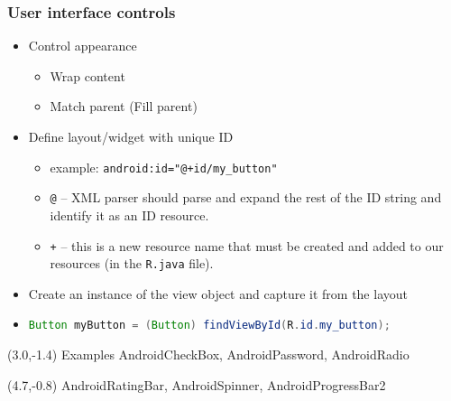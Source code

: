 \documentclass[10pt,xcolor=pdflatex]{beamer}
\newcommand{\inlinejava}{\lstinline[language={Java},basicstyle=\ttfamily,keepspaces]}
\begin{document}
\begin{frame}\frametitle{User interface controls}
	\begin{itemize}
		\item Control appearance
          \begin{itemize}
        	\item Wrap content
        	\item Match parent (Fill parent)
          \end{itemize}
        \item Define layout/widget with unique ID
          \begin{itemize}
            \item example: \texttt{android:id="@+id/my\_button"}
            \item \texttt{@} --  XML parser should parse and expand the rest of the ID string and identify it as an ID resource.
            \item \texttt{+} -- this is a new resource name that must be created and added to our resources (in the \texttt{R.java} file).
          \end{itemize}
        \item Create an instance of the view object and capture it from the layout
        \item[] {\footnotesize \inlinejava{Button myButton = (Button) findViewById(R.id.my_button);}}
        \ttfamily
	\end{itemize}
\begin{textblock}{15}(3.0,-1.4)
    {\footnotesize Examples AndroidCheckBox, AndroidPassword, AndroidRadio}
\end{textblock}
\begin{textblock}{15}(4.7,-0.8)
    {\footnotesize AndroidRatingBar, AndroidSpinner, AndroidProgressBar2}
\end{textblock}
\end{frame}
\end{document}
